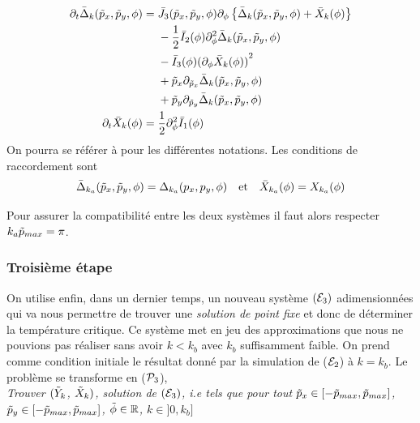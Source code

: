 \documentclass[10.5pt]{article}
\begin{document}
\begin{multicols}{2}
\begin{align}
	\partial_t  \bar{\Delta}_k (\tilde{p}_x, \tilde{p}_y, \phi) & = 
	\begin{aligned}[t]
	&  \bar{J}_3(\tilde{p}_x, \tilde{p}_y, \phi) \partial_{\phi} \left\{ \bar{\Delta}_k (\tilde{p}_x, \tilde{p}_y, \phi) + \bar{X}_k(\phi) \right\} \\
	&  - \frac{1}{2} \bar{I}_2(\phi) \partial_{\phi}^2 \bar{\Delta}_k(\tilde{p}_x, \tilde{p}_y, \phi) \\
	& - \bar{I}_3(\phi){(\partial_{\phi} \bar{X}_k(\phi))}^2 \\
	& + \tilde{p}_x \partial_{\tilde{p}_x} \bar{\Delta}_k (\tilde{p}_x, \tilde{p}_y, \phi)  \\
	& + \tilde{p}_y \partial_{\tilde{p}_y}  \bar{\Delta}_k (\tilde{p}_x, \tilde{p}_y, \phi) 
	\end{aligned}
	\label{eqn} \\
	\partial_t \bar{X}_k(\phi) & = 
	\begin{aligned}[t]
		& \frac{1}{2} \partial_{\phi}^2 \bar{I}_1(\phi)
	\end{aligned}
\end{align}
On pourra se référer à  pour les différentes notations. Les conditions de raccordement sont
\begin{equation*}
\bar{\Delta}_{k_a}(\tilde{p}_x, \tilde{p}_y, \phi) = \Delta_{k_a}(p_x, p_y, \phi) \quad \text{et} \quad \bar{X}_{k_a}(\phi) = X_{k_a}(\phi)
\end{equation*}

Pour assurer la compatibilité entre les deux systèmes il faut alors respecter $k_a\tilde{p}_{max} = \pi$. \\




\subsubsection{Troisième étape}

On utilise enfin, dans un dernier temps, un nouveau système $(\mathcal{E}_3)$ adimensionnées qui va nous permettre de trouver une \textit{solution de point fixe} et donc de déterminer la température critique. Ce système met en jeu des approximations que nous ne pouvions pas réaliser sans avoir $k < k_b$ avec $k_b$ suffisamment faible. On prend comme condition initiale le résultat donné par la simulation de ($\mathcal{E}_2$) à $k = k_b$. Le problème se transforme en ($\mathcal{P}_3$), \\

\noindent
{\itshape Trouver $(\tilde{Y}_k$, $\tilde{X}_k)$, solution de $(\mathcal{E}_3)$, i.e tels que pour tout $\tilde{p}_x \in [-\tilde{p}_{max}, \tilde{p}_{max}]$, $\tilde{p}_y \in [-\tilde{p}_{max}, \tilde{p}_{max}]$, $\tilde{\phi} \in \mathbb{R}$, $k\in ]0, k_b]$}


\end{multicols}
\end{document}
